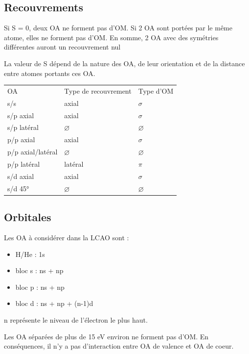 \documentclass[french]{yLectureNote}
\begin{document}
\subsection{Recouvrements}
\begin{proposition}[Recouvrement]
Si S = 0, deux OA ne forment pas d'OM. Si 2 OA sont portées par le m\^eme atome, elles ne forment pas d'OM. En somme, 2 OA avec des symétries différentes auront un recouvrement nul
\end{proposition}
La valeur de S dépend de la nature des OA, de leur orientation et de la distance entre atomes portants ces OA.
\begin{center}
\begin{tabular}{lll}
OA & Type de recouvrement & Type d'OM\\
s/s & axial & \(\sigma\)\\
s/p axial & axial & \(\sigma\)\\
s/p latéral & \(\varnothing\) & \(\varnothing\)\\
p/p axial & axial & \(\sigma\)\\
p/p axial/latéral & \(\varnothing\) & \(\varnothing\)\\
p/p latéral & latéral & \(\pi\)\\
s/d axial & axial & \(\sigma\)\\
s/d 45° & \(\varnothing\) & \(\varnothing\)
\end{tabular}
\end{center}
\subsection{Orbitales}
Les OA à considérer dans la LCAO sont :
\begin{proposition}[OA à considérer]
\begin{itemize}
 \item H/He : 1s
 \item bloc s : ns + np
 \item bloc p : ns + np
 \item bloc d : ns + np + (n-1)d
\end{itemize}
n représente le niveau de l'électron  le plus haut.
\end{proposition}
\begin{theorem}[Règle de 15 eV]
 Les OA séparées de plus de 15 eV environ ne forment pas d'OM. En conséquences, il n'y a pas d'interaction entre OA de valence et OA de coeur.
\end{theorem}
\end{document}
